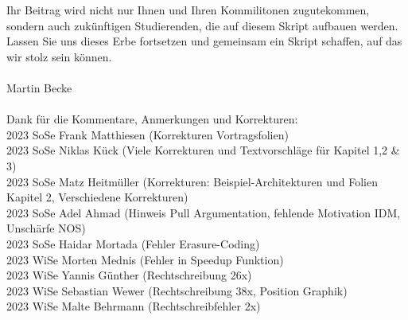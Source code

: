 \documentclass[a4paper]{article}
\begin{document}
Ihr Beitrag wird nicht nur Ihnen und Ihren Kommilitonen zugutekommen, sondern auch zukünftigen Studierenden, die auf diesem Skript aufbauen werden. Lassen Sie uns dieses Erbe fortsetzen und gemeinsam ein Skript schaffen, auf das wir stolz sein können.
\\\\
Martin Becke 
\\\\
Dank für die Kommentare, Anmerkungen und Korrekturen:  \\
2023 SoSe Frank Matthiesen (Korrekturen Vortragsfolien) \\
2023 SoSe Niklas Kück (Viele Korrekturen und Textvorschläge für Kapitel 1,2 \& 3)\\
2023 SoSe Matz Heitmüller (Korrekturen: Beispiel-Architekturen und Folien Kapitel 2, Verschiedene Korrekturen) \\
2023 SoSe Adel Ahmad (Hinweis Pull Argumentation, fehlende Motivation IDM, Unschärfe NOS) \\
2023 SoSe Haidar Mortada (Fehler  Erasure-Coding) \\  
2023 WiSe Morten Mednis (Fehler in Speedup Funktion) \\
2023 WiSe Yannis Günther (Rechtschreibung 26x) \\
2023 WiSe Sebastian Wewer (Rechtschreibung 38x, Position Graphik) \\
2023 WiSe Malte Behrmann (Rechtschreibfehler 2x)\\
\\
\tableofcontents
\newpage

\newpage

\newpage

\newpage


\newpage


\newpage


\newpage




\renewcommand{\indexname}{Stichwortverzeichnis}
\printindex
\newpage
\printbibliography
\end{document}
